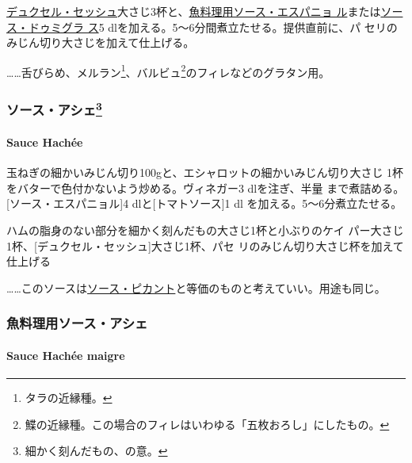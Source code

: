 \href{}{デュクセル・セッシュ}大さじ3杯と、\protect\hyperlink{sauce-espagnole-maigre}{魚料理用ソース・エスパニョ
ル}または\protect\hyperlink{sauce-demi-glace}{ソース・ドゥミグラ ス}5
dlを加える。5〜6分間煮立たせる。提供直前に、パ
セリのみじん切り大さじ\undemi{}を加えて仕上げる。

\ldots{}\ldots{}舌びらめ、メルラン\footnote{タラの近縁種。}、バルビュ\footnote{鰈の近縁種。この場合のフィレはいわゆる「五枚おろし」にしたもの。}のフィレなどのグラタン用。

\maeaki

\hypertarget{ux30bdux30fcux30b9ux30a2ux30b7ux30a743}{%
\subsubsection[ソース・アシェ]{\texorpdfstring{ソース・アシェ\footnote{細かく刻んだもの、の意。}}{ソース・アシェ}}\label{ux30bdux30fcux30b9ux30a2ux30b7ux30a743}}

\hypertarget{sauce-hachee}{%
\paragraph{Sauce Hachée}\label{sauce-hachee}}

 

玉ねぎの細かいみじん切り100gと、エシャロットの細かいみじん切り大さじ
1\undemi{}杯をバターで色付かないよう炒める。ヴィネガー3 dlを注ぎ、半量
まで煮詰める。{[}ソース・エスパニョル{]}4
dlと{[}トマトソース{]}1\undemi{} dl を加える。5〜6分煮立たせる。

ハムの脂身のない部分を細かく刻んだもの大さじ1\undemi{}杯と小ぶりのケイ
パー大さじ1\undemi{}杯、{[}デュクセル・セッシュ{]}大さじ1\undemi{}杯、パセ
リのみじん切り大さじ\undemi{}杯を加えて仕上げる

\ldots{}\ldots{}このソースは\protect\hyperlink{ux30bdux30fcux30b9ux30d4ux30abux30f3ux30c8}{ソース・ピカント}と等価のものと考えていい。用途も同じ。

\maeaki

\hypertarget{ux9b5aux6599ux7406ux7528ux30bdux30fcux30b9ux30a2ux30b7ux30a7}{%
\subsubsection{魚料理用ソース・アシェ}\label{ux9b5aux6599ux7406ux7528ux30bdux30fcux30b9ux30a2ux30b7ux30a7}}

\hypertarget{sauce-hachee-maigre}{%
\paragraph{Sauce Hachée maigre}\label{sauce-hachee-maigre}}

